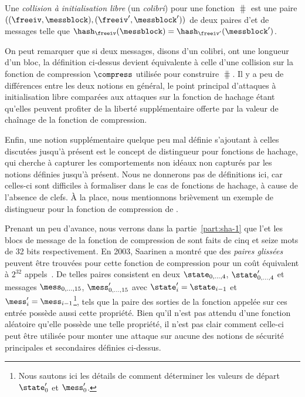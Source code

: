 \begin{fdefi}
Une \emph{collision à initialisation libre} (un \emph{colibri})
pour une fonction \merkdam 
$\hash$ est une paire $((\freeiv,\messblock), (\freeiv',\messblock'))$
de deux paires d'\iv et de messages telle que $\hash_\freeiv(\messblock) = \hash_{\freeiv'}(\messblock')$.
\end{fdefi}

On peut remarquer que si deux messages, disons d'un colibri, ont une longueur d'un bloc, la définition ci-dessus devient équivalente à celle
d'une collision sur la fonction de compression
$\compress$ utilisée pour construire $\hash$.
Il y a peu de différences entre les deux notions en général, le point principal d'attaques à initialisation libre comparées aux attaques sur la fonction de hachage étant qu'elles
peuvent profiter de la liberté supplémentaire offerte par la valeur de chaînage de la fonction de compression.

\bigskip

Enfin, une notion supplémentaire quelque peu mal définie s'ajoutant à celles discutées jusqu'à présent est le concept de distingueur pour fonctions de hachage,
qui cherche à capturer les comportements non idéaux non capturés par les notions définies jusqu'à présent. Nous ne donnerons pas de définitions ici,
car celles-ci sont difficiles à formaliser dans le cas de fonctions de hachage, à cause de l'absence de clefs. À la place, nous mentionnons brièvement
un exemple de distingueur pour la fonction de compression de \shaone. 

Prenant un peu d'avance, nous verrons dans la partie~\ref{part:sha-1} que l'\iv et les blocs de message  de la fonction
de compression de \shaone sont faits de cinq et seize mots de 32 bits respectivement.
En 2003, Saarinen a montré que des \emph{paires glissées} peuvent être trouvées pour cette fonction de compression pour un coût
équivalent à $2^{32}$ appels~\cite{DBLP:conf/fse/Saarinen03}.
De telles paires consistent en deux
\ivs $\state_{0,\ldots,4}$, $\state'_{0,\ldots,4}$ et messages $\mess_{0,\ldots,15}$,
$\mess'_{0,\ldots,15}$ avec $\state'_i = \state_{i-1}$ et $\mess'_i = \mess_{i-1}$\footnote{Nous sautons ici les détails de comment déterminer les valeurs de départ
$\state'_0$ et $\mess'_0$.}, tels que la paire des sorties de la fonction appelée sur ces entrée possède aussi cette propriété.
Bien qu'il n'est pas attendu d'une fonction aléatoire qu'elle possède une telle propriété, il n'est pas clair comment celle-ci peut être utilisée pour monter
une attaque sur aucune des notions de sécurité principales et secondaires définies ci-dessus.


